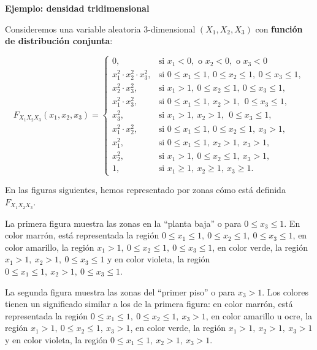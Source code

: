 \documentclass[]{book}
\begin{document}
\textbf{Ejemplo: densidad tridimensional}

Consideremos una variable aleatoria \(3\)-dimensional \((X_1,X_2,X_3)\) con \textbf{función de distribución conjunta}:

\[
F_{X_1X_2X_3}(x_1,x_2,x_3)=\begin{cases}
0, & \mbox{si }x_1<0,\mbox{ o }x_2<0,\mbox{ o }x_3 <0\\
x_1^2\cdot x_2^2\cdot x_3^2, & \mbox{si }0\leq x_1\leq 1,\ 0\leq x_2\leq 1,\ 0\leq x_3\leq 1, \\
 x_2^2\cdot x_3^2, & \mbox{si }x_1> 1,\ 0\leq x_2\leq  1,\ 0\leq x_3\leq  1, \\
 x_1^2\cdot x_3^2, & \mbox{si }0\leq x_1\leq  1,\ x_2> 1,\ \ 0\leq x_3\leq  1, \\
 x_3^2, & \mbox{si }x_1> 1,\ x_2> 1,\ \ 0\leq x_3\leq  1, \\
 x_1^2\cdot x_2^2, & \mbox{si }0\leq x_1\leq  1,\ 0\leq x_2\leq  1,\ x_3> 1,\\
 x_1^2, & \mbox{si }0\leq x_1\leq  1,\ x_2 >  1,\ x_3> 1,\\
 x_2^2, & \mbox{si }x_1>1,\ 0\leq x_2\leq  1,\ x_3> 1,\\
1, & \mbox{si }x_1\geq 1,\ x_2\geq 1,\ x_3\geq 1.
\end{cases}
\]

En las figuras siguientes, hemos representado por zonas cómo está definida \(F_{X_1X_2X_3}\).

La primera figura muestra las zonas en la ``planta baja'' o para \(0\leq x_3\leq 1\).
En color marrón, está representada la región \(0\leq x_1\leq 1,\ 0\leq x_2\leq 1,\ 0\leq x_3\leq 1\), en color amarillo, la región \(x_1> 1,\ 0\leq x_2\leq 1,\ 0\leq x_3\leq 1\), en color verde, la región \(x_1>1,\ x_2>1,\ 0\leq x_3\leq 1\) y en color violeta, la región \(0\leq x_1\leq 1,\ x_2>1,\ 0\leq x_3\leq 1\).

La segunda figura muestra las zonas del ``primer piso'' o para \(x_3>1\). Los colores tienen un significado similar a los de la primera figura: en color marrón, está representada la región \(0\leq x_1\leq 1,\ 0\leq x_2\leq 1,\  x_3> 1\), en color amarillo u ocre, la región \(x_1> 1,\ 0\leq x_2\leq 1,\ x_3> 1\), en color verde, la región \(x_1>1,\ x_2>1,\ x_3> 1\) y en color violeta, la región \(0\leq x_1\leq 1,\ x_2>1,\ x_3> 1\).
\end{document}
